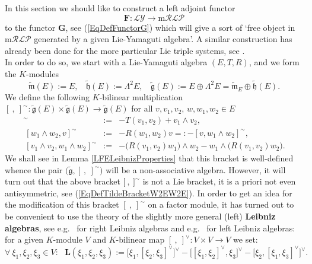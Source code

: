 \documentclass [11pt] {article}
\theoremstyle{definition}
\begin{document}
\noindent In this section we should like to construct a left adjoint
functor 
\begin{equation}
	\mathbf{F}:\mathcal{LY} \longrightarrow  \mathrm{m}\mathcal{RLP}
\end{equation}
to the functor $\mathbf{G}$, see (\ref{EqDefFunctorG}) which will give a sort of `free object in $\mathrm{m}\mathcal{RLP}$ generated by a given Lie-Yamaguti algebra'.
A similar construction has already been done for the more particular Lie triple systems, see
\cite{Smi11}.\\
In order to do so, we start with a Lie-Yamaguti algebra
$(E,T,R)$, and we form the $K$-modules
\begin{equation}\label{EqDefTildeGE}
 \tilde{\mathfrak{m}}(E) := E,~~~~
 \tilde{\mathfrak{h}}(E) :=\Lambda^2E,~~~~\tilde{\mathfrak{g}}(E):= E\oplus \Lambda^2E=
 \tilde{\mathfrak{m}}_E\oplus \tilde{\mathfrak{h}}(E).
\end{equation}
We define the following $K$-bilinear multiplication 
$[~,~]^\sim:\tilde{\mathfrak{g}}(E)\times \tilde{\mathfrak{g}}(E)\to \tilde{\mathfrak{g}}(E)$ for all
 $v,v_1,v_2$, $w,w_1,w_2\in E$
\begin{eqnarray}
 [v_1,v_2]^\sim & := & -T(v_1,v_2)+ v_1\wedge v_2, 
                    \label{EqDefTildeBracketEE} \\
 ~[w_1\wedge w_2, v]^\sim & := &
      -R(w_1,w_2)v =: -[v,w_1\wedge w_2]^\sim,
               \label{EqDefTildeBracketEW2E} \\
 ~[v_1\wedge v_2,w_1\wedge w_2]^\sim & := &
   -\big(R(v_1,v_2)w_1\big)\wedge w_2
   -w_1\wedge \big(R(v_1,v_2)w_2\big).
      \label{EqDefTildeBracketW2EW2E}
\end{eqnarray}
We shall see in Lemma \ref{LFELeibnizProperties} that
this bracket is well-defined whence the pair
$\big(\tilde{\mathfrak{g}},[~,~]^\sim\big)$
will be a non-associative algebra. However,
it will turn out that the above bracket 
$\big[~,~\big]^\sim$ is not a Lie bracket,
it is a priori not even antisymmetric, see 
(\ref{EqDefTildeBracketW2EW2E}).
In order to get an idea for the modification of this bracket $[~,~]^\sim$ on a factor module, it has turned out to be convenient
to use the theory of the slightly more general (left) \textbf{Leibniz algebras}, see e.g.~\cite[p.~332]{Lod92} for right Leibniz algebras and e.g.~\cite{F} for left Leibniz algebras:  for a given
$K$-module $V$ and $K$-bilinear map $[~,~]^\vee:V\times V\to V$
we set:
\begin{equation}\label{EqDefLeibnizIdentityMapL}
	\forall~\xi_1,\xi_2,\xi_3\in V:~~~
 \mathbf{L}(\xi_1,\xi_2,\xi_3):=
    \big[\xi_1,[\xi_2,\xi_3]^\vee\big]^\vee
     -\big[[\xi_1,\xi_2]^\vee,\xi_3\big]^\vee
     -\big[\xi_2,[\xi_1,\xi_3]^\vee\big]^\vee.
\end{equation}
\end{document}
